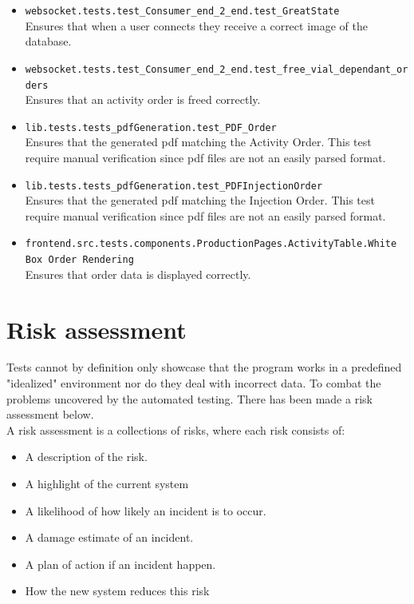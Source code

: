 \documentclass{article}
\begin{document}
\begin{itemize}
  \item \texttt{websocket.tests.test\_Consumer\_end\_2\_end.test\_GreatState}\\
  Ensures that when a user connects they receive a correct image of the database.
  \item \texttt{websocket.tests.test\_Consumer\_end\_2\_end.test\_free\_vial\_dependant\_orders}\\
  Ensures that an activity order is freed correctly.
  \item \texttt{lib.tests.tests\_pdfGeneration.test\_PDF\_Order}\\
  Ensures that the generated pdf matching the Activity Order. This test require manual verification since pdf files are not an easily parsed format.
  \item \texttt{lib.tests.tests\_pdfGeneration.test\_PDFInjectionOrder}\\
  Ensures that the generated pdf matching the Injection Order. This test require manual verification since pdf files are not an easily parsed format.
  \item \texttt{frontend.src.tests.components.ProductionPages.ActivityTable.White Box Order Rendering}\\
  Ensures that order data is displayed correctly.
\end{itemize}

\section*{Risk assessment}

Tests cannot by definition only showcase that the program works in a predefined "idealized" environment nor do they deal with incorrect data.
To combat the problems uncovered by the automated testing. There has been made a risk assessment below.\\
A risk assessment is a collections of risks, where each risk consists of:

\begin{itemize}
  \item A description of the risk.
  \item A highlight of the current system
  \item A likelihood of how likely an incident is to occur.
  \item A damage estimate of an incident.
  \item A plan of action if an incident happen.
  \item How the new system reduces this risk
\end{itemize}
\end{document}
